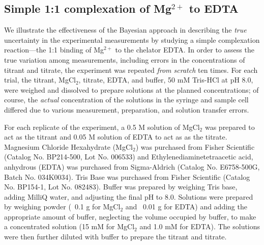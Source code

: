 \documentclass[aps,pre,twocolumn,nofootinbib,superscriptaddress,linenumbers]{revtex4-1}
\begin{document}


\subsection{Simple 1:1 complexation of Mg$^{2+}$ to EDTA}

We illustrate the effectiveness of the Bayesian approach in describing the \emph{true} uncertainty in the experimental measurements by studying a simple complexation reaction---the 1:1 binding of Mg$^{2+}$ to the chelator EDTA.
In order to assess the true variation among measurements, including errors in the concentrations of titrant and titrate, the experiment was repeated \emph{from scratch} ten times.
For each trial, the titrant, MgCl$_2$, titrate, EDTA, and buffer, 50 mM Tris-HCl at pH 8.0, were weighed and dissolved to prepare solutions at the planned concentrations; of course, the \emph{actual} concentration of the solutions in the syringe and sample cell differed due to various measurement, preparation, and solution transfer errors.

For each replicate of the experiment, a 0.5 M solution of MgCl$_2$ was prepared to act as the titrant and 0.05 M solution of EDTA to act as as the titrate.
Magnesium Chloride Hexahydrate (MgCl$_2$) was purchased from Fisher Scientific (Catalog No. BP214-500, Lot No. 006533) and Ethylenediaminetetraacetic acid, anhydrous (EDTA) was purchased from Sigma-Aldrich (Catalog No. E6758-500G, Batch No. 034K0034).
Tris Base was purchased from Fisher Scientific (Catalog No. BP154-1, Lot No. 082483).
Buffer was prepared by weighing Tris base, adding MilliQ water, and adjusting the final pH to 8.0.
Solutions were prepared by weighing powder (~0.1 g for MgCl$_2$ and ~0.01 g for EDTA) and adding the appropriate amount of buffer, neglecting the volume occupied by buffer, to make a concentrated solution (15 mM for MgCl$_2$ and 1.0 mM for EDTA).  The solutions were then further diluted with buffer to prepare the titrant and titrate.
\end{document}
